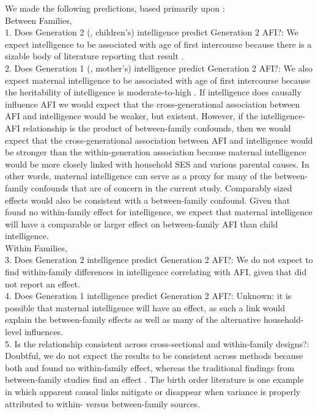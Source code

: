 We made the following predictions, based primarily upon \citet{harden2011don}:\\ 
Between Families,\\
1. Does Generation 2 (\ie, children's) intelligence predict Generation 2 AFI?: We expect intelligence to be associated with age of first intercourse because there is a sizable body of literature reporting that result \citep{kirby2002effective, manlove1998influence, raffaelli2003sexual, rodgers1994df}.\\ 
2. Does Generation 1 (\ie, mother's) intelligence predict Generation 2 AFI?: We also expect maternal intelligence to be associated with age of first intercourse because the heritability of intelligence is moderate-to-high \citep{Bouchard2004,devlin1997heritability}. If intelligence does causally influence AFI we would expect that the cross-generational association between AFI and intelligence would be weaker, but existent. However, if the intelligence-AFI relationship is the product of between-family confounds, then we would expect that the cross-generational association between AFI and intelligence would be stronger than the within-generation association because maternal intelligence would be more closely linked with household SES and various parental causes. In other words, maternal intelligence can serve as a proxy for many of the between-family confounds that are of concern in the current study. Comparably sized effects would also be consistent with a between-family confound. Given that \citet{harden2011don} found no within-family effect for intelligence, we expect that maternal intelligence will have a comparable or larger effect on between-family AFI than child intelligence.\\
Within Families,\\
3. Does Generation 2 intelligence predict Generation 2 AFI?: We do not expect to find within-family differences in intelligence correlating with AFI, given that \citet{harden2011don} did not report an effect.\\
4. Does Generation 1 intelligence predict Generation 2 AFI?: Unknown: it is possible that maternal intelligence will have an effect, as such a link would explain the between-family effects as well as many of the alternative household-level influences.\\
5. Is the relationship consistent across cross-sectional and within-family designs?: Doubtful, we do not expect the results to be consistent across methods because both \citet{harden2011don} and \citet{Meredith2013} found no within-family effect, whereas the traditional findings from between-family studies find an effect \citep{kirby2002effective, manlove1998influence, raffaelli2003sexual}. The birth order literature is one example in which apparent causal links mitigate or disappear when variance is properly attributed to within- versus between-family sources.